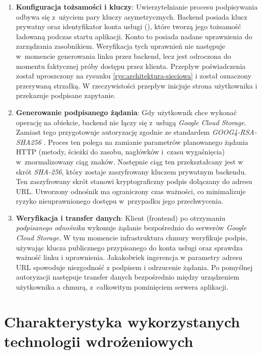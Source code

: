 \begin{enumerate}
    \item \textbf{Konfiguracja tożsamości i kluczy}: Uwierzytelnianie procesu podpisywania odbywa się z~użyciem pary kluczy asymetrycznych. Backend posiada klucz prywatny oraz identyfikator konta usługi (), które tworzą jego tożsamość ładowaną podczas startu aplikacji. Konto to posiada nadane uprawnienia do zarządzania zasobnikiem. Weryfikacja tych uprawnień nie następuje w~momencie generowania linku przez backend, lecz jest odroczona do momentu faktycznej próby dostępu przez klienta. Przepływ poświadczenia został uproszczony na rysunku \ref{rys:architektura-sieciowa} i został oznaczony przerywaną strzałką. W rzeczywistości przepływ inicjuje strona użytkownika i przekazuje podpisane zapytanie.
    
    \item \textbf{Generowanie podpisanego żądania}: Gdy użytkownik chce wykonać operację na obiekcie, backend nie łączy się z~usługą \textit{Google Cloud Storage}. Zamiast tego przygotowuje autoryzację zgodnie ze standardem \textit{GOOG4-RSA-SHA256} \cite{google_sign_rsa_sha}. Proces ten polega na zamianie parametrów planowanego żądania HTTP (metody, ścieżki do zasobu, nagłówków i~czasu wygaśnięcia) w~znormalizowany ciąg znaków. Następnie ciąg ten przekształcany jest w skrót \textit{SHA-256}, który zostaje zaszyfrowany kluczem prywatnym backendu. Ten zaszyfrowany skrót stanowi kryptograficzny podpis dołączany do adresu URL. Utworzony odnośnik ma ograniczony czas ważności, co minimalizuje ryzyko nieuprawnionego dostępu w~przypadku jego przechwycenia.
    
    \item \textbf{Weryfikacja i transfer danych}: Klient (frontend) po otrzymaniu \textit{podpisanego odnośnika} wykonuje żądanie bezpośrednio do serwerów \textit{Google Cloud Storage}. W tym momencie infrastruktura chmury weryfikuje podpis, używając klucza publicznego przypisanego do konta usługi oraz sprawdza ważność linku i uprawnienia. Jakakolwiek ingerencja w parametry adresu URL spowoduje niezgodność z podpisem i odrzucenie żądania. Po pomyślnej autoryzacji następuje transfer danych bezpośrednio między urządzeniem użytkownika a chmurą, z~całkowitym pominięciem serwera aplikacji.
\end{enumerate}


\section{Charakterystyka wykorzystanych technologii wdrożeniowych}

